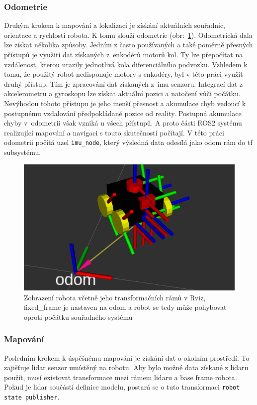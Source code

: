 \subsubsection*{Odometrie}
Druhým krokem k mapování a lokalizaci je získání aktuálních souřadnic, orientace a rychlosti robota. K tomu slouží odometrie (obr:~\ref{fig:rviz_odom}). Odometrická dala lze získat několika způsoby. Jedním z často používaných a také poměrně přesných přístupů je využití dat získaných z~enkodérů motorů kol. Ty lze přepočítat na vzdálenost, kterou urazily jednotlivá kola diferenciálního podvozku. \cite[str:~171-172]{mobilní_roboty} Vzhledem k tomu, že použitý robot nedisponuje motory s enkodéry, byl v této práci využit druhý přístup. Tím je zpracování dat získaných z~imu senzoru. Integrací dat z akcelerometru a gyroskopu lze získat aktuální pozici a natočení vůči počátku. Nevýhodou tohoto přístupu je jeho menší přesnost a akumulace chyb vedoucí k postupnému vzdalování předpokládané pozice od reality. Postupná akumulace chyby v~odometrii však vzniká u všech přístupů. A proto části ROS2 systému realizující mapování a navigaci s touto skutečností počítají. V této práci odometrii počítá uzel \verb|imu_node|, který výsledná data odesílá jako odom rám do tf subsystému. 

\begin{figure}[h!]
	\centering
	\includegraphics[scale=0.6]{obrazky-figures/odom.png}
	\caption[Zobrazení transformací a odometrie v nástroji Rviz]{Zobrazení robota včetně jeho transformačních rámů v Rviz, fixed\_frame je nastaven na odom a robot se tedy může pohybovat oproti počátku souřadného systému}
	\label{fig:rviz_odom}
\end{figure}

\subsubsection*{Mapování}
Posledním krokem k úspěšnému mapování je získání dat o okolním prostředí. To zajišťuje lidar senzor umístěný na robotu. Aby bylo možné data získané z lidaru použít, musí existovat transformace mezi rámem lidaru a base frame robota. Pokud je lidar součástí definice modelu, postará se o tuto transformaci \verb|robot state publisher|.

